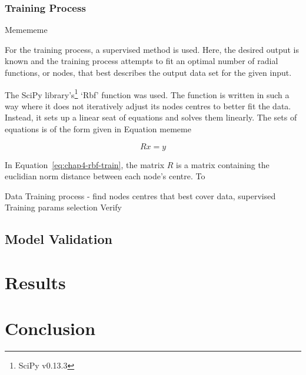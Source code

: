 \subsubsection{Training Process}

Memememe

For the training process, a supervised method is used. Here, the desired output is known and the training process attempts to fit an optimal number of radial functions, or nodes, that best describes the output data set for the given input. 

The SciPy library's\footnote{SciPy v0.13.3} `Rbf' function was used. The function is written in such a way where it does not iteratively adjust its nodes centres to better fit the data. Instead, it sets up a linear seat of equations and solves them linearly. The sets of equations is of the form given in Equation mememe

\begin{equation}
  \label{eq:chap4-rbf-train}
  Rx = y
\end{equation}

In Equation~\ref{eq:chap4-rbf-train}, the matrix $R$ is a matrix containing the euclidian norm distance between each node's centre. To 

Data
Training process - find nodes centres that best cover data, supervised
Training params selection
Verify


\subsection{Model Validation}

\section{Results}

\section{Conclusion}


